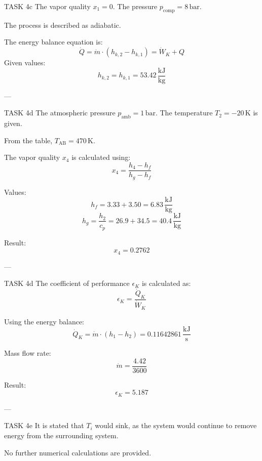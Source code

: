 TASK 4c  
The vapor quality \( x_1 = 0 \).  
The pressure \( p_{\text{comp}} = 8 \, \text{bar} \).  

The process is described as adiabatic.  

The energy balance equation is:  
\[
\dot{Q} = \dot{m} \cdot (h_{k,2} - h_{k,1}) = \dot{W}_K + Q
\]  
Given values:  
\[
h_{k,2} = h_{k,1} = 53.42 \, \frac{\text{kJ}}{\text{kg}}
\]  

---

TASK 4d  
The atmospheric pressure \( p_{\text{amb}} = 1 \, \text{bar} \).  
The temperature \( T_2 = -20 \, \text{K} \) is given.  

From the table, \( T_{\text{AB}} = 470 \, \text{K} \).  

The vapor quality \( x_4 \) is calculated using:  
\[
x_4 = \frac{h_4 - h_f}{h_g - h_f}
\]  

Values:  
\[
h_f = 3.33 + 3.50 = 6.83 \, \frac{\text{kJ}}{\text{kg}}
\]  
\[
h_g = \frac{h_2}{c_p} = 26.9 + 34.5 = 40.4 \, \frac{\text{kJ}}{\text{kg}}
\]  

Result:  
\[
x_4 = 0.2762
\]  

---

TASK 4d  
The coefficient of performance \( \epsilon_K \) is calculated as:  
\[
\epsilon_K = \frac{\dot{Q}_K}{\dot{W}_K}
\]  

Using the energy balance:  
\[
\dot{Q}_K = \dot{m} \cdot (h_1 - h_2) = 0.11642861 \, \frac{\text{kJ}}{\text{s}}
\]  

Mass flow rate:  
\[
\dot{m} = \frac{4.42}{3600}
\]  

Result:  
\[
\epsilon_K = 5.187
\]  

---

TASK 4e  
It is stated that \( T_i \) would sink, as the system would continue to remove energy from the surrounding system.  

No further numerical calculations are provided.